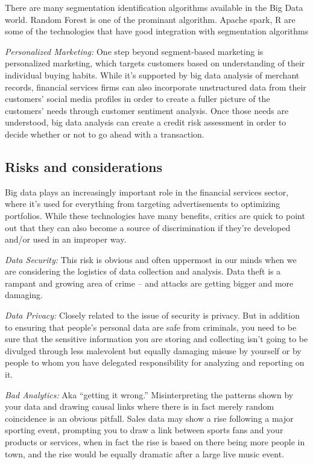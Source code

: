 \documentclass[sigconf]{acmart}
\begin{document}
There are many segmentation identification algorithms available in the Big Data world.  Random Forest is one of the prominant algorithm. Apache spark, R are some of the technologies that have good integration with segmentation algorithms

\textit{Personalized Marketing:} One step beyond segment-based marketing is personalized marketing, which targets customers based on understanding of their individual buying habits. While it’s  supported by big data analysis of merchant records, financial services firms can also incorporate unstructured data from their customers' social media profiles in order to create a fuller picture of the customers' needs through customer sentiment analysis. Once those needs are understood, big data analysis can create a credit risk assessment in order to decide whether or not to go ahead with a transaction.\cite{5-big-data-use-cases-in-banking-and-financial-services}

\subsection{Risks and considerations}

Big data plays an increasingly important role in the financial services sector, where it’s used for everything from targeting advertisements to optimizing portfolios. While these technologies have many benefits, critics are quick to point out that they can also become a source of discrimination if they're developed and/or used in an improper way.\cite{risk-with-bigdata}

\textit{Data Security:} This risk is obvious and often uppermost in our minds when we are considering the logistics of data collection and analysis. Data theft is a rampant and growing area of crime – and attacks are getting bigger and more damaging. \cite{5risks-bigdata}

\textit{Data Privacy:} Closely related to the issue of security is privacy. But in addition to ensuring that people’s personal data are safe from criminals, you need to be sure that the sensitive information you are storing and collecting isn’t going to be divulged through less malevolent but equally damaging misuse by yourself or by people to whom you have delegated responsibility for analyzing and reporting on it.\cite{5risks-bigdata}

\textit{Bad Analytics:} Aka “getting it wrong.” Misinterpreting the patterns shown by your data and drawing causal links where there is in fact merely random coincidence is an obvious pitfall. Sales data may show a rise following a major sporting event, prompting you to draw a link between sports fans and your products or services, when in fact the rise is based on there being more people in town, and the rise would be equally dramatic after a large live music event.\cite{5risks-bigdata}
\end{document}
